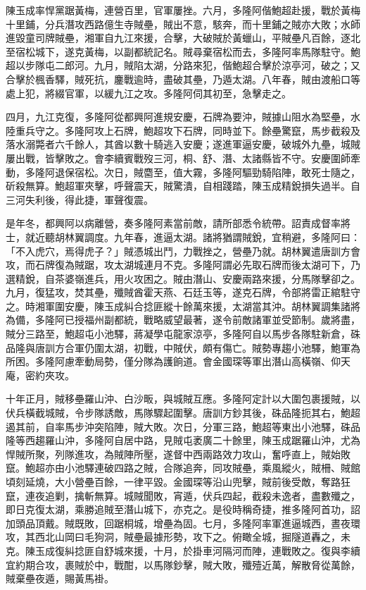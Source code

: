 \begin{pinyinscope}
陳玉成率悍黨踞黃梅，連營百里，官軍屢挫。六月，多隆阿偕鮑超赴援，戰於黃梅十里鋪，分兵潛攻西路億生寺賊壘，賊出不意，駭奔，而十里鋪之賊亦大敗；水師進毀童司牌賊壘，湘軍自九江來援，合擊，大破賊於黃蠟山，平賊壘凡百餘，逐北至宿松城下，遂克黃梅，以副都統記名。賊尋棄宿松而去，多隆阿率馬隊駐守。鮑超以步隊屯二郎河。九月，賊陷太湖，分路來犯，偕鮑超合擊於涼亭河，破之；又合擊於楓香驛，賊死抗，鏖戰逾時，盡破其壘，乃遁太湖。八年春，賊由渡船口等處上犯，將綴官軍，以緩九江之攻。多隆阿伺其初至，急擊走之。

四月，九江克復，多隆阿從都興阿進規安慶，石牌為要沖，賊據山阻水為堅壘，水陸重兵守之。多隆阿攻上石牌，鮑超攻下石牌，同時並下。餘壘驚竄，馬步截殺及落水溺斃者六千餘人，其酋以數十騎逃入安慶；遂進軍逼安慶，破城外九壘，城賊屢出戰，皆擊敗之。會李續賓戰歿三河，桐、舒、潛、太諸縣皆不守。安慶圍師牽動，多隆阿退保宿松。次日，賊麕至，值大霧，多隆阿驅勁騎陷陣，敢死士隨之，斫殺無算。鮑超軍夾擊，呼聲震天，賊驚潰，自相踐踏，陳玉成精銳損失過半。自三河失利後，得此捷，軍聲復震。

是年冬，都興阿以病離營，奏多隆阿素當前敵，請所部悉令統帶。詔責成督率將士，就近聽胡林翼調度。九年春，進逼太湖。諸將猶謂賊銳，宜稍避，多隆阿曰：「不入虎穴，焉得虎子？」賊憑城出鬥，力戰挫之，營壘乃就。胡林翼遣唐訓方會攻，而石牌復為賊踞，攻太湖城連月不克。多隆阿謂必先取石牌而後太湖可下，乃選精銳，自茶婆嶺進兵，用火攻困之。賊由潛山、安慶兩路來援，分馬隊擊卻之。九月，復猛攻，焚其壘，殲賊酋霍天燕、石廷玉等，遂克石牌，令部將雷正綰駐守之。時湘軍圍安慶，陳玉成糾合捻匪縱十餘萬來援，太湖當其沖。胡林翼調集諸將為備，多隆阿已授福州副都統，戰略威望最著，遂令前敵諸軍並受節制。歲將盡，賊分三路至，鮑超屯小池驛，蔣凝學屯龍家涼亭，多隆阿自以馬步各隊駐新倉，硃品隆與唐訓方合軍仍圍太湖，初戰，中賊伏，頗有傷亡。賊勢專趨小池驛，鮑軍為所困。多隆阿慮牽動局勢，僅分隊為護餉道。會金國琛等軍出潛山高橫嶺、仰天庵，密約夾攻。

十年正月，賊移壘羅山沖、白沙畈，與城賊互應。多隆阿定計以大圍包裹援賊，以伏兵橫截城賊，令步隊誘敵，馬隊驟起圍擊。唐訓方鈔其後，硃品隆扼其右，鮑超遏其前，自率馬步沖突陷陣，賊大敗。次日，分軍三路，鮑超等東出小池驛，硃品隆等西趨羅山沖，多隆阿自居中路，見賊屯袤廣二十餘里，陳玉成踞羅山沖，尤為悍賊所聚，列隊進攻，為賊陣所壓，遂督中西兩路效力攻山，奮呼直上，賊始敗竄。鮑超亦由小池驛連破四路之賊，合隊追奔，同攻賊壘，乘風縱火，賊柵、賊館頃刻延燒，大小營壘百餘，一律平毀。金國琛等沿山兜擊，賊前後受敵，奪路狂竄，連夜追剿，擒斬無算。城賊聞敗，宵遁，伏兵四起，截殺未逸者，盡數殲之，即日克復太湖，乘勝追賊至潛山城下，亦克之。是役時稱奇捷，推多隆阿首功，詔加頭品頂戴。賊既敗，回踞桐城，增壘為固。七月，多隆阿率軍進逼城西，晝夜環攻，其西北山岡曰毛狗洞，賊壘最據形勢，攻下之。俯瞰全城，掘隧道轟之，未克。陳玉成復糾捻匪自舒城來援，十月，於掛車河隔河而陣，連戰敗之。復與李續宜約期合攻，裹賊於中，戰酣，以馬隊鈔擊，賊大敗，殲殪近萬，解散脅從萬餘，賊棄壘夜遁，賜黃馬褂。


\end{pinyinscope}
